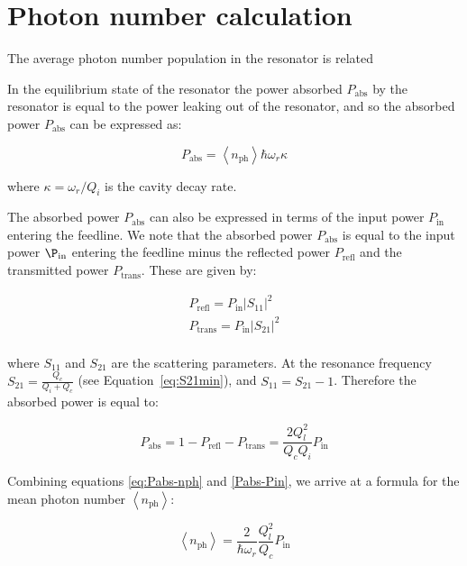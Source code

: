 

\chapter{Photon number calculation}
  \label{ch:photon number calculation}

  The average photon number population in the resonator is related

  In the equilibrium state of the resonator the power absorbed $P_\text{abs}$ by the resonator is equal to the power leaking out of the resonator, and so the absorbed power $P_\text{abs}$ can be expressed as:

  \begin{equation}
    P_\text{abs} = \left<n_\text{ph}\right>\hbar\omega_r \kappa
    \label{eq:Pabs-nph}
  \end{equation}

  where $\kappa=\omega_r/Q_i$ is the cavity decay rate.

  The absorbed power $P_\text{abs}$ can also be expressed in terms of the input power $P_\text{in}$ entering the feedline. We note that the absorbed power $P_\text{abs}$ is equal to the input power $\P_\text{in}$ entering the feedline minus the reflected power $P_\text{refl}$ and the transmitted power $P_\text{trans}$. These are given by:

  \begin{align}
    P_\text{refl} = P_\text{in}\left|S_{11}\right|^2\\
    P_\text{trans} = P_\text{in}\left|S_{21}\right|^2\\
  \end{align}

  where $S_{11}$ and $S_{21}$ are the scattering parameters. At the resonance frequency $S_{21}=\frac{Q_c}{Q_i+Q_c}$ (see Equation~\ref{eq:S21min}), and $S_{11}=S_{21}-1$. Therefore the absorbed power is equal to:

  \begin{equation}
    P_\text{abs}=1-P_\text{refl}-P_\text{trans}=\frac{2Q_l^2}{Q_c Q_i}P_\text{in}
    \label{Pabs-Pin}
  \end{equation}

  Combining equations \ref{eq:Pabs-nph} and \ref{Pabs-Pin}, we arrive at a formula for the mean photon number $\left<n_\text{ph}\right>$:

  \begin{equation}
    \left<n_\text{ph}\right> = \frac{2}{\hbar \omega_r}\frac{Q_l^2}{Q_c}P_\text{in}
  \end{equation}

